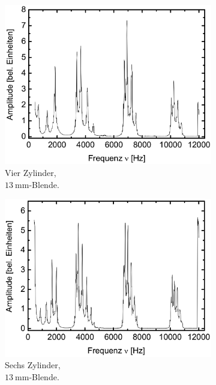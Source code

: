 \begin{figure}
\begin{subfigure}{0.3\textwidth}
    \centering
    \includegraphics[width=\textwidth]{korrektur/4_50mm_13.png}
    \caption{Vier Zylinder,\\$\SI{13}{\milli\meter}$-Blende.}
  \end{subfigure}
  \begin{subfigure}{0.3\textwidth}
    \centering
    \includegraphics[width=\textwidth]{korrektur/6_50mm_13.png}
    \caption{Sechs Zylinder,\\$\SI{13}{\milli\meter}$-Blende.}
  \end{subfigure}
  \begin{subfigure}{0.3\textwidth}
    \centering

\end{subfigure}
\end{figure}
